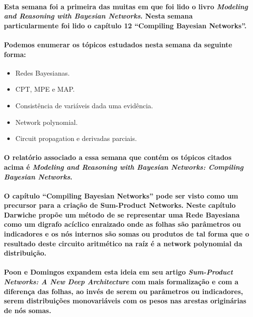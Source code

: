 \documentclass[a4paper,10pt]{article}
\theoremstyle{plain}
\begin{document}
\paragraph{
  Esta semana foi a primeira das muitas em que foi lido o livro \textit{Modeling and Reasoning with
  Bayesian Networks}\cite{bayes-net-darwiche}. Nesta semana particularmente foi lido o capítulo
  12 ``Compiling Bayesian Networks''.
}

\paragraph{
  Podemos enumerar os tópicos estudados nesta semana da seguinte forma:
}

\begin{itemize}
  \item Redes Bayesianas.
  \item CPT, MPE e MAP.
  \item Consistência de variáveis dada uma evidência.
  \item Network polynomial.
  \item Circuit propagation e derivadas parciais.
\end{itemize}

\paragraph{
  O relatório associado a essa semana que contém os tópicos citados acima é \textit{Modeling and
  Reasoning with Bayesian Networks: Compiling Bayesian Networks}\cite{report-1}.
}

\paragraph{
  O capítulo ``Compiling Bayesian Networks'' pode ser visto como um precursor para a criação de
  Sum-Product Networks. Neste capítulo Darwiche propõe um método de se representar uma Rede
  Bayesiana como um digrafo acíclico enraizado onde as folhas são parâmetros ou indicadores e os
  nós internos são somas ou produtos de tal forma que o resultado deste circuito aritmético na raíz
  é a network polynomial da distribuição.
}

\paragraph{
  Poon e Domingos expandem esta ideia em seu artigo \textit{Sum-Product Networks: A New Deep
  Architecture}\cite{poon-domingos} com mais formalização e com a diferença das folhas, ao invés
  de serem ou parâmetros ou indicadores, serem distribuições monovariáveis com os pesos nas arestas
  originárias de nós somas.
}
\end{document}
